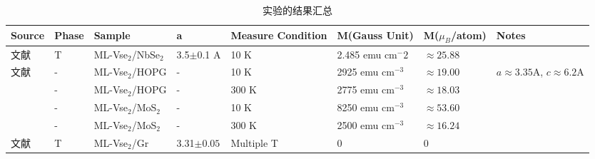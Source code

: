 \documentclass[reprint, aps, prb, showkeys]{revtex4-2}
\begin{document}
\begin{table*}
    \caption{\label{table:Result_Summary} 实验的结果汇总}
    \begin{ruledtabular}
        \begin{tabular}{llllllll}
            Source                                    & Phase & Sample              & a              & Measure Condition & M(Gauss Unit)      & M($\mu_B$/atom) & Notes                                \\
            \hline
            文献\cite{Kezilebieke2020}                  & T     & ML-Vse$_2$/NbSe$_2$ & 3.5$\pm$0.1 A  & 10 K              & 2.485 emu cm$^-2$  & \multicolumn{2}{l}{$\approx 25.88$}                    \\
            文献\cite{Bonilla2018}                      & -     & ML-Vse$_2$/HOPG     & -              & 10 K              & 2925 emu cm$^{-3}$ & $\approx 19.00$ & $a \approx 3.35 $A, $c \approx 6.2$A \\
                                                      & -     & ML-Vse$_2$/HOPG     & -              & 300 K             & 2775 emu cm$^{-3}$ & \multicolumn{2}{l}{$\approx 18.03$}                    \\
                                                      & -     & ML-Vse$_2$/MoS$_2$  & -              & 10 K              & 8250 emu cm$^{-3}$ & \multicolumn{2}{l}{$\approx 53.60$}                    \\
                                                      & -     & ML-Vse$_2$/MoS$_2$  & -              & 300 K             & 2500 emu cm$^{-3}$ & \multicolumn{2}{l}{$\approx 16.24$}                    \\
            文献\cite{doi:10.1021/acs.nanolett.8b01649} & T     & ML-Vse$_2$/Gr       & 3.31$\pm 0.05$ & Multiple T        & 0                  & 0               &                                     
            \end{tabular}
    \end{ruledtabular}
\end{table*}

\appendix 
\end{document}

